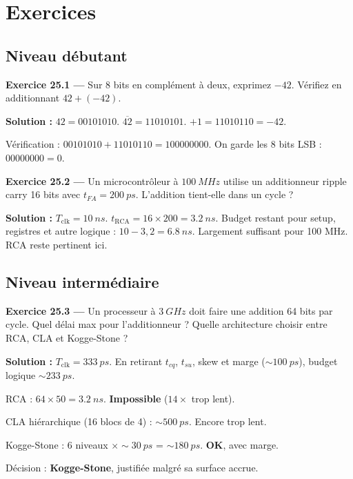 \documentclass[12pt,a4paper,twoside]{book}
\begin{document}
\section*{Exercices}

\subsection*{Niveau débutant}

\textbf{Exercice 25.1 ---} Sur 8 bits en complément à deux, exprimez $-42$. Vérifiez en additionnant $42 + (-42)$.

\begin{pratique}
\textbf{Solution :} $42 = 00101010$. $\overline{42} = 11010101$. $+1 = 11010110 = -42$.

Vérification : $00101010 + 11010110 = 100000000$. On garde les 8 bits LSB : $00000000 = 0$. \checkmark
\end{pratique}

\textbf{Exercice 25.2 ---} Un microcontrôleur à $\SI{100}{MHz}$ utilise un additionneur ripple carry 16 bits avec $t_{FA} = \SI{200}{ps}$. L'addition tient-elle dans un cycle ?

\begin{pratique}
\textbf{Solution :} $T_{\text{clk}} = \SI{10}{ns}$. $t_{\text{RCA}} = 16\times200 = \SI{3.2}{ns}$. Budget restant pour setup, registres et autre logique : $10 - 3{,}2 = \SI{6.8}{ns}$. Largement suffisant pour 100 MHz. RCA reste pertinent ici.
\end{pratique}

\subsection*{Niveau intermédiaire}

\textbf{Exercice 25.3 ---} Un processeur à $\SI{3}{GHz}$ doit faire une addition 64 bits par cycle. Quel délai max pour l'additionneur ? Quelle architecture choisir entre RCA, CLA et Kogge-Stone ?

\begin{pratique}
\textbf{Solution :} $T_{\text{clk}} = \SI{333}{ps}$. En retirant $t_{cq}$, $t_{su}$, skew et marge ($\sim\SI{100}{ps}$), budget logique $\sim\SI{233}{ps}$.

RCA : $64 \times 50 = \SI{3.2}{ns}$. \textbf{Impossible} ($14\times$ trop lent).

CLA hiérarchique (16 blocs de 4) : $\sim\SI{500}{ps}$. Encore trop lent.

Kogge-Stone : $6$ niveaux $\times \sim\SI{30}{ps}$ = $\sim\SI{180}{ps}$. \textbf{OK}, avec marge.

Décision : \textbf{Kogge-Stone}, justifiée malgré sa surface accrue.
\end{pratique}
\end{document}
